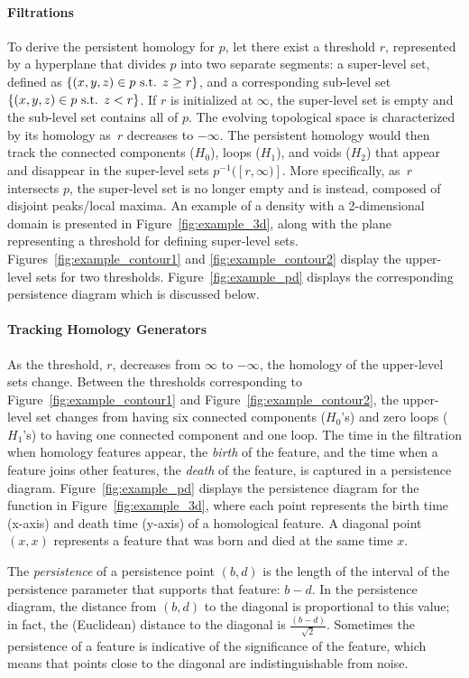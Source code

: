 \documentclass[12pt]{article}
\begin{document}
\paragraph{Filtrations}
To derive the persistent homology for $p$, let there exist a threshold $r$, represented by a hyperplane that divides $p$ into two separate segments: a super-level set, defined as $\{(x,y,z) \in p \textup{ s.t. } z \geq r \}$, and a corresponding sub-level set $\{(x,y,z) \in p \textup{ s.t. } z < r \}$. If $r$ is initialized at $\infty$, the super-level set is empty and the sub-level set contains all of $p$. The evolving topological space is characterized by its homology as~$r$ decreases to $-\infty$. The persistent homology would then track the connected
components ($H_{0}$), loops ($H_{1}$), and voids ($H_{2}$) that appear and disappear in the super-level sets $p^{-1}([r,\infty)]$. More specifically, as~$r$ intersects $p$, the super-level set is no longer empty and is instead, composed of disjoint peaks/local maxima.  An example of a density with a 2-dimensional domain is presented in Figure~\ref{fig:example_3d}, along with the plane representing a threshold for defining super-level sets.  Figures~\ref{fig:example_contour1} and \ref{fig:example_contour2} display the upper-level sets for two thresholds.  Figure~\ref{fig:example_pd} displays the corresponding persistence diagram which is discussed below.


\paragraph{Tracking Homology Generators}
As the threshold, $r$, decreases from $\infty$ to $-\infty$, the homology of the upper-level sets change.  Between the thresholds corresponding to  Figure~\ref{fig:example_contour1} and Figure~\ref{fig:example_contour2}, the upper-level set changes from having six connected components ($H_0$'s) and zero loops ($H_1$'s) to having one connected component and one loop.  The time in the filtration when homology features appear, the \emph{birth} of the feature, and the time when a feature joins other features, the \emph{death} of the feature, is captured in a persistence diagram. Figure~\ref{fig:example_pd} displays the persistence diagram for the function in Figure~\ref{fig:example_3d}, where each point represents the birth time (x-axis) and death time (y-axis) of a homological feature. A
diagonal point $(x,x)$ represents a feature that was born and died at the same time $x$.

The \emph{persistence} of a persistence point $(b,d)$ is the length of the interval of the persistence parameter that supports that feature: $b-d$.  In the persistence diagram, the distance from $(b,d)$ to the diagonal is proportional to this value; in fact, the (Euclidean) distance to the diagonal is $\frac{(b-d)}{\sqrt{2}}$. Sometimes the persistence of a feature is indicative of the significance of the feature, which means that points close to the diagonal are indistinguishable from noise.
\end{document}
